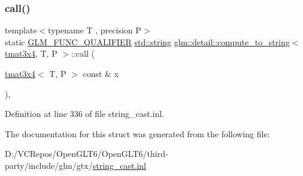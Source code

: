 \subsubsection{\texorpdfstring{call()}{call()}}
{\footnotesize\ttfamily template$<$typename T , precision P$>$ \\
static \mbox{\hyperlink{setup_8hpp_a33fdea6f91c5f834105f7415e2a64407}{G\+L\+M\+\_\+\+F\+U\+N\+C\+\_\+\+Q\+U\+A\+L\+I\+F\+I\+ER}} \mbox{\hyperlink{glad_8h_ac83513893df92266f79a515488701770}{std\+::string}} \mbox{\hyperlink{structglm_1_1detail_1_1compute__to__string}{glm\+::detail\+::compute\+\_\+to\+\_\+string}}$<$ \mbox{\hyperlink{structglm_1_1tmat3x4}{tmat3x4}}, T, P $>$\+::call (\begin{DoxyParamCaption}\item[{\mbox{\hyperlink{structglm_1_1tmat3x4}{tmat3x4}}$<$ T, P $>$ const \&}]{x }\end{DoxyParamCaption})\hspace{0.3cm}{\ttfamily [inline]}, {\ttfamily [static]}}



Definition at line 336 of file string\+\_\+cast.\+inl.



The documentation for this struct was generated from the following file\+:\begin{DoxyCompactItemize}
\item 
D\+:/\+V\+C\+Repos/\+Open\+G\+L\+T6/\+Open\+G\+L\+T6/third-\/party/include/glm/gtx/\mbox{\hyperlink{string__cast_8inl}{string\+\_\+cast.\+inl}}\end{DoxyCompactItemize}
